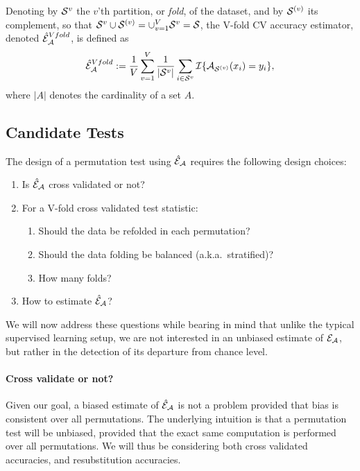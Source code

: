 \documentclass[12pt,a4paper]{article}
\begin{document}
\begin{definition}
\label{def:v-fold}
Denoting by $\mathcal{S}^{v}$ the $v$'th partition, or \emph{fold}, of the dataset, and by $\mathcal{S}^{(v)}$ its complement, so that $\mathcal{S}^{v} \cup \mathcal{S}^{(v)}=\cup_{v=1}^V \mathcal{S}^{v}=\mathcal{S}$, the V-fold CV accuracy estimator, denoted $\hat{\mathcal{E}}_{\mathcal{A}}^{Vfold}$, is defined as 	
\begin{align}
	\hat{\mathcal{E}}_{\mathcal{A}}^{Vfold} := 
	\frac 1V \sum_{v=1}^{V} \frac{1}{|\mathcal{S}^v|} \sum_{i \in \mathcal{S}^{v}} \mathcal{I}{\{ \mathcal{A}_{\mathcal{S}^{(v)}}(x_i)=y_i \}},
\end{align}
where $|A|$ denotes the cardinality of a set $A$.
\end{definition}




\subsection{Candidate Tests}
\label{sec:considerations}

The design of a permutation test using $\hat{\mathcal{E}}_{\mathcal{A}}$ requires the following design choices: 
\begin{enumerate}
\item Is $\hat{\mathcal{E}}_{\mathcal{A}}$ cross validated or not?
\item For a V-fold cross validated test statistic:
\begin{enumerate}
\item Should the data be refolded in each permutation? 
\item Should the data folding be balanced (a.k.a.\ stratified)?
\item How many folds? 
\end{enumerate}
\item How to estimate $\hat{\mathcal{E}}_{\mathcal{A}}$?
\end{enumerate}

We will now address these questions while bearing in mind that unlike the typical supervised learning setup, we are not interested in an unbiased estimate of $\mathcal{E}_{\mathcal{A}}$, but rather in the detection of its departure from chance level. 

\paragraph{Cross validate or not?}
Given our goal, a biased estimate of $\hat{\mathcal{E}}_{\mathcal{A}}$ is not a problem provided that bias is consistent over all permutations. 
The underlying intuition is that a permutation test will be unbiased, provided that the exact same computation is performed over all permutations. 
We will thus be considering both cross validated accuracies, and resubstitution accuracies.
\end{document}
